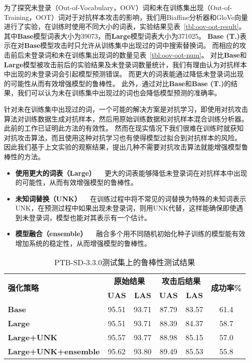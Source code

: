 为了探究未登录（Out-of-Vocabulary，OOV）词和未在训练集出现（Out-of-Training，OOT）词对于对抗样本攻击的影响，我们用Biaffine分析器和GloVe向量进行了实验，在训练时使用不同大小的词表，实验结果见表~\ref{tbl:oov-oot-result}。
其中\textbf{Base}模型词表大小为39073，而\textbf{Large}模型词表大小为371025。
\textbf{Base (T.)}表示在对\textbf{Base}模型攻击时只允许从训练集中出现过的词中搜索替换词。
而相应的攻击前后未登录词和未在训练集出现词的数量见表~\ref{tbl:oov-oot-num}。
对比\textbf{Base}和\textbf{Large}模型被攻击前后的实验结果及未登录词数量统计，我们有理由认为对抗样本中出现的未登录词会引起模型预测错误。
而更大的词表能通过降低未登录词出现的可能性从而有效增强模型的鲁棒性。
此外，通过对比\textbf{Base}和\textbf{Base (T.)}的结果，我们可以认为未在训练集中出现过的词也会降低模型预测的准确率。

针对未在训练集中出现过的词，一个可能的解决方案是对抗学习，即使用对抗攻击算法对训练数据生成对抗样本，然后用原始训练数据和对抗样本混合训练分析器。
此前的工作\cite{zheng2020evaluating}已证明此方法的有效性。
然而在现实情况下我们很难在训练时就获知对抗攻击算法，而且使用这种对抗学习也有使得模型过拟合到对抗样本的风险。
因此我们基于上文实验的观察结果，提出几种不需要对抗攻击算法就能增强模型鲁棒性的方法。

\begin{itemize}
	\item \textbf{使用更大的词表（Large）} \ \ 更大的词表能够降低未登录词在对抗样本中出现的可能性，从而有效增强模型的鲁棒性。
	\item \textbf{未知词替换（UNK）} \ \ 在训练过程中将不常见的词替换为特殊的未知词表示UNK，在预测过程中如果出现未登录词，则用UNK代替，这样能确保即使遇到未登录词，模型也能对其表示有一个估计。
	\item \textbf{模型融合（ensemble）} \ \ 融合多个用不同随机初始化种子训练的模型能有效增加系统的稳定性，从而增强模型的鲁棒性。
\end{itemize}

\begin{table}[h]
	\centering
	\small
	\renewcommand{\arraystretch}{1.2}
	\begin{tabular}{l||cc|cc|c}
		\hline
		\multirow{2}{*}{\bf 强化策略}& \multicolumn{2}{c|}{\bf 原始结果} & \multicolumn{2}{c|}{\bf 攻击后结果} & \multirow{2}{*}{\bf 成功率\%} \\
		\cline{2-5}
		& \bf UAS & \bf LAS & \bf UAS & \bf LAS & \\
		\hline
		\bf Base &95.51 &93.71 &87.79 &83.57 &61.4 \\
		\bf Large &95.51 &93.71 &88.39 &84.37 &58.7 \\
		\bf Large+UNK &95.57 &93.77 &88.98 &85.15 &57.0 \\
		\bf Large+UNK+ensemble &95.62 &93.80 &89.49 &85.53 &55.8 \\
		\hline
	\end{tabular}
	\caption{PTB-SD-3.3.0测试集上的鲁棒性测试结果} 
	\label{tbl:attack-increase}
\end{table}

